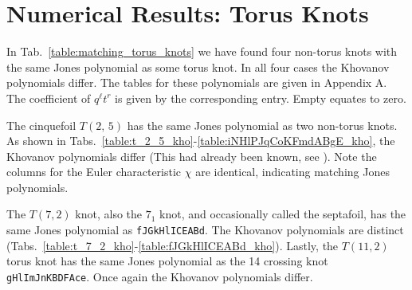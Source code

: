 \documentclass{article}
\theoremstyle{plain}
\begin{document}
    \section{Numerical Results: Torus Knots}
        \begin{table}[H]
            \centering
            \caption{Knots whose Jones polynomial matches that of a Torus Knot}
            \label{table:matching_torus_knots}
        \end{table}
        In Tab.~\ref{table:matching_torus_knots}
        we have found four non-torus knots with the same
        Jones polynomial as some torus knot. In all four cases the Khovanov
        polynomials differ. The tables for these polynomials are given
        in Appendix A.
        The coefficient of $q^{\ell}t^{r}$ is given by the corresponding entry.
        Empty equates to zero.
        \par\hfill\par
        The cinquefoil $T(2,\,5)$ has the same Jones polynomial as two
        non-torus knots. As shown in
        Tabs.~\ref{table:t_2_5_kho}-\ref{table:iNHlPJqCoKFmdABgE_kho}, the
        Khovanov polynomials differ
        (This had already been known, see \cite{KatlasKhoHo}).
        Note the columns for the Euler characteristic $\chi$ are identical,
        indicating matching Jones polynomials.
        \par\hfill\par
        The $T(7,2)$ knot, also the $7_{1}$ knot, and occasionally called the
        septafoil, has the same Jones polynomial as \texttt{fJGkHlICEABd}. The
        Khovanov polynomials are distinct
        (Tabs.~\ref{table:t_7_2_kho}-\ref{table:fJGkHlICEABd_kho}).
        Lastly, the $T(11,2)$ torus knot has the same Jones polynomial as the
        14 crossing knot \texttt{gHlImJnKBDFAce}. Once again the Khovanov
        polynomials differ.
\end{document}
